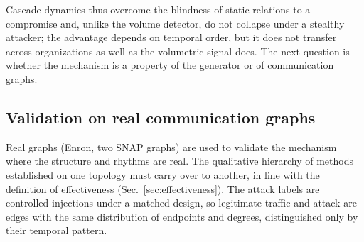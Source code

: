 \noindent Cascade dynamics thus overcome the blindness of static relations to a compromise and, unlike the
volume detector, do not collapse under a stealthy attacker; the advantage depends on temporal order, but it
does not transfer across organizations as well as the volumetric signal does. The next question is whether the mechanism is a property of the generator or of communication
graphs.

\subsection{Validation on real communication graphs}
\label{sec:res-realgraphs}
Real graphs (Enron, two SNAP graphs) are used to validate the mechanism where the structure and rhythms are
real. The qualitative hierarchy of methods established on one topology must carry over to another, in line
with the definition of effectiveness (Sec.~\ref{sec:effectiveness}). The attack labels are controlled
injections under a matched design, so legitimate traffic and attack are edges with the same distribution of
endpoints and degrees, distinguished only by their temporal pattern.


